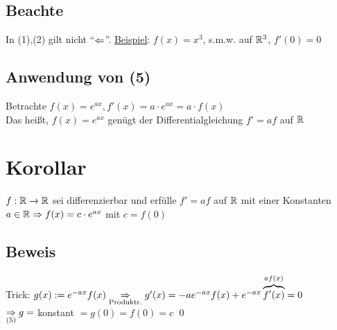 \subsection*{Beachte}
In (1),(2) gilt nicht "`$\Leftarrow$"'.
\underline{Beispiel}: $f(x)=x^3$, s.m.w. auf $\mathbb{R}^3$, $f'(0)=0$

\subsection*{Anwendung von (5)}
Betrachte $f(x)=e^{ax}, f'(x)=a \cdot e^{ax} = a \cdot f(x)$\\
Das heißt, $f(x)=e^{ax}$ genügt der Differentialgleichung $f'=af$ auf $\mathbb{R}$

\section{Korollar}\label{11.14}
$f: \mathbb{R} \to \mathbb{R}$ sei differenzierbar und erfülle $f'=af$ auf $\mathbb{R}$ mit einer Konstanten $a \in \mathbb{R} \Rightarrow f(x)=c \cdot e^{ax}$ mit $c = f(0)$

\subsection*{Beweis}
Trick: $g(x) := e^{-ax} f(x) \underset{\text{Produktr.}}{\Rightarrow} g'(x) = -ae^{-ax} f(x) + e^{-ax} \overbrace{f'(x)}^{af(x)} = 0$\\
$\underset{(5)}{\Rightarrow} g =$ konstant $= g(0) = f(0) = c$ \qed
